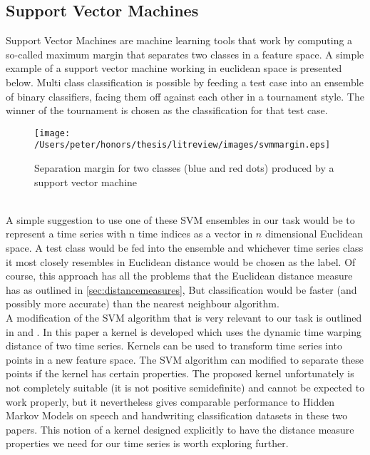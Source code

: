 	\subsection{Support Vector Machines}
	\label{sec:svms}
	Support Vector Machines are machine learning tools that work by computing a so-called maximum margin that separates two classes in a feature space. A simple example of a support vector machine working in euclidean space is presented below. Multi class classification is possible by feeding a test case into an ensemble of binary classifiers, facing them off against each other in a tournament style. The winner of the tournament is chosen as the classification for that test case.
	\begin{figure}[ht!]
	\centering
	\texttt{[image: /Users/peter/honors/thesis/litreview/images/svmmargin.eps]}
	\label{svmtrain}
	\caption{Separation margin for two classes (blue and red dots) produced  by a support vector machine}
	\end{figure}
	\\
	A simple suggestion to use one of these SVM ensembles in our task would be to represent a time series with n time indices as a vector in $n$ dimensional Euclidean space. A test class would be fed into the ensemble and whichever time series class it most closely resembles in Euclidean distance would be chosen as the label. Of course, this approach has all the problems that the Euclidean distance measure has as outlined in \ref{sec:distancemeasures}, But classification would be faster (and possibly more accurate) than the nearest neighbour algorithm.
	\\
	A modification of the SVM algorithm that is very relevant to our task is outlined in \citep{shimodaira2002dynamic} and \citep{bahlmann2002online}. In this paper a kernel is developed which uses the dynamic time warping distance of two time series. Kernels can be used to transform time series into points in a new feature space. The SVM algorithm can modified to separate these points if the kernel has certain properties. The proposed kernel unfortunately is not completely suitable (it is not positive semidefinite) and cannot be expected to work properly, but it nevertheless gives comparable performance to Hidden Markov Models on speech and handwriting classification datasets in these two papers. This notion of a kernel designed explicitly to have the distance measure properties we need for our time series is worth exploring further.
	
	

